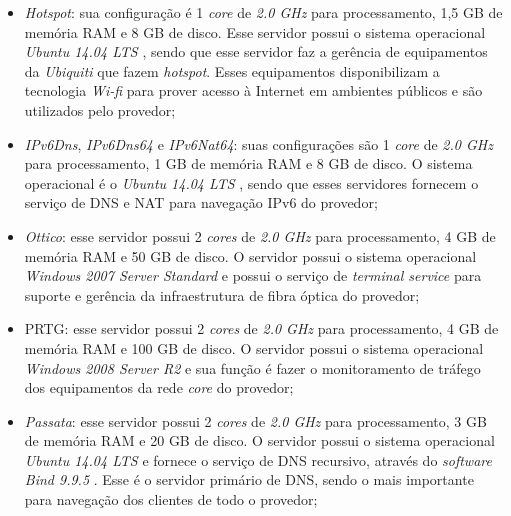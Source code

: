\begin{itemize}
 \item \textit{Hotspot}: sua configuração é 1 \textit{core} de \textit{2.0 GHz} para processamento, 1,5 GB de memória RAM e 8 GB de disco. 
 Esse servidor possui o sistema operacional \textit{Ubuntu 14.04 \ac{LTS}} \cite{ubuntu}, sendo que esse servidor faz a gerência de equipamentos 
 da \textit{Ubiquiti} que fazem \textit{hotspot}. Esses equipamentos disponibilizam a tecnologia \textit{Wi-fi} para prover acesso à Internet em 
 ambientes públicos e são utilizados pelo provedor;
 
 \item \textit{IPv6Dns}, \textit{IPv6Dns64} e \textit{IPv6Nat64}: suas configurações são 1 \textit{core} de \textit{2.0 GHz} para processamento, 
 1 GB de memória RAM e 8 GB de disco. O sistema operacional é o \textit{Ubuntu 14.04 \ac{LTS}} \cite{ubuntu}, sendo que esses servidores fornecem 
 o serviço de \ac{DNS} e \ac{NAT} para navegação \ac{IPv6} do provedor;
 
 \item \textit{Ottico}: esse servidor possui 2 \textit{cores} de \textit{2.0 GHz} para processamento, 4 GB de memória RAM e 50 GB de disco. 
 O servidor possui o sistema operacional \textit{Windows 2007 Server Standard} e possui o serviço de \textit{terminal service} para suporte e 
 gerência da infraestrutura de fibra óptica do provedor;
 
 \item \ac{PRTG}: esse servidor possui 2 \textit{cores} de \textit{2.0 GHz} para processamento, 4 GB de memória RAM e 100 GB de disco. 
 O servidor possui o sistema operacional \textit{Windows 2008 Server R2} e sua função é fazer o monitoramento de tráfego dos equipamentos da 
 rede \textit{core} do provedor;
 
 \item \textit{Passata}: esse servidor possui 2 \textit{cores} de \textit{2.0 GHz} para processamento, 3 GB de memória RAM e 20 GB de disco. 
 O servidor possui o sistema operacional \textit{Ubuntu 14.04 \ac{LTS}} \cite{ubuntu} e fornece o serviço de \ac{DNS} recursivo, através do 
 \textit{software} \textit{Bind 9.9.5} \cite{bind}. Esse é o servidor primário de \ac{DNS}, sendo o mais importante para navegação dos clientes 
 de todo o provedor;
 

\end{itemize}
